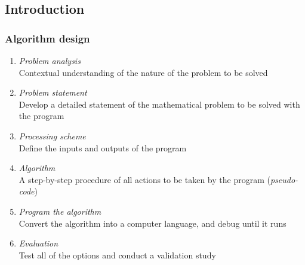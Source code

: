 \subsection*{Introduction}
\begin{frame}[fragile]
  \frametitle{Algorithm design}
  \begin{enumerate}
     \item \emph{Problem analysis}\\ Contextual understanding of the nature of the problem to be solved
     \item \emph{Problem statement}\\ Develop a detailed statement of the mathematical problem to be solved with the program
     \item \emph{Processing scheme}\\ Define the inputs and outputs of the program
     \item \emph{Algorithm}\\ A step-by-step procedure of all actions to be taken by the program (\emph{pseudo-code})
     \item \emph{Program the algorithm}\\ Convert the algorithm into a computer language, and debug until it runs
     \item \emph{Evaluation}\\ Test all of the options and conduct a validation study
  \end{enumerate}
\end{frame}
% 

